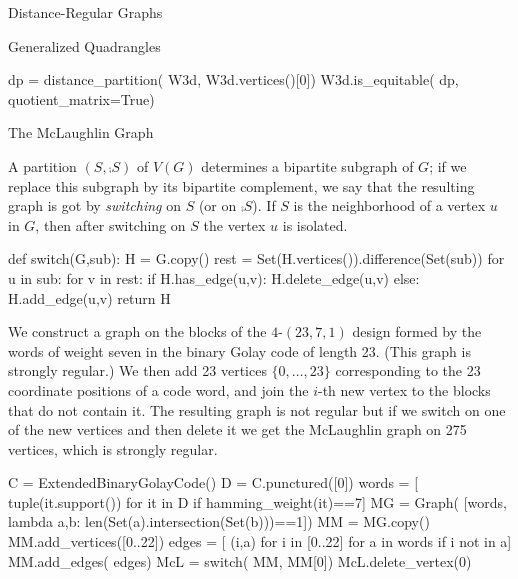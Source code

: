 \begin{chap}{Distance-Regular Graphs}
\begin{sect}{Generalized Quadrangles}
%
\begin{sagecode}
\begin{sageinput}
dp = distance_partition( W3d, W3d.vertices()[0])
W3d.is_equitable( dp, quotient_matrix=True) 
\end{sageinput}
\begin{sageoutput}
[ 0 12  0]
[ 1  2  9]
[ 0  4  8]
\end{sageoutput}
\end{sagecode}
%
\end{sect}
%
\begin{sect}{The McLaughlin Graph}
%
\begin{para}
A partition $(S,\comp{S})$ of $V(G)$ determines a bipartite subgraph of $G$;
if we replace this subgraph by its bipartite complement, we say that the
resulting graph is got by \textsl{switching} on $S$ (or on $\comp{S}$).
If $S$ is the neighborhood of a vertex $u$ in $G$, then after switching
on $S$ the vertex $u$ is isolated.
\end{para}
%
\begin{sagecode}
\begin{sageinput}
def switch(G,sub):
    H = G.copy()
    rest = Set(H.vertices()).difference(Set(sub))
    for u in sub:
        for v in rest:
            if H.has_edge(u,v): H.delete_edge(u,v)
            else: H.add_edge(u,v)
    return H   
\end{sageinput}
\end{sagecode}
%
\begin{para}
We construct a graph on the blocks of the $4$-$(23,7,1)$ design
formed by the words of weight seven in the binary Golay code of length 23.
(This graph is strongly regular.)
We then add 23 vertices $\{0,\ldots,23\}$ corresponding to the 23 coordinate 
positions of a code word, and join the $i$-th new vertex to the blocks
that do not contain it. The resulting graph is not regular but if we switch on
one of the new vertices and then delete it we get the McLaughlin graph
on 275 vertices, which is strongly regular.
\end{para}
%
\begin{sagecode}
\begin{sageinput}
C = ExtendedBinaryGolayCode()
D = C.punctured([0])
words = [ tuple(it.support()) for it in D if hamming_weight(it)==7]
MG = Graph( [words, lambda a,b: len(Set(a).intersection(Set(b)))==1])
MM = MG.copy()
MM.add_vertices([0..22])
edges = [ (i,a) for i in [0..22] for a in words if i not in a]
MM.add_edges( edges)
McL = switch( MM, MM[0])
McL.delete_vertex(0)
\end{sageinput}

\end{sagecode}
\end{sect}
\end{chap}
